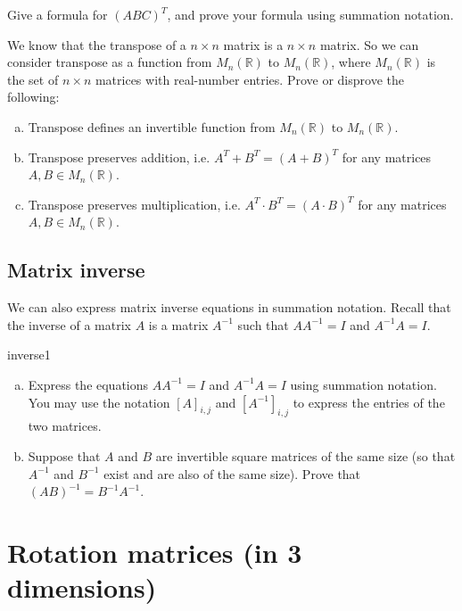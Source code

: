 \begin{exercise}{}
Give a formula for $(ABC)^T$, and prove your formula using summation notation.
\end{exercise}

\begin{exercise}{}
We know that the transpose of a $n \times n$ matrix is a $n \times n$ matrix.  So we can consider transpose as a function from $M_n(\mathbb{R})$ to $M_n(\mathbb{R})$, where   $M_n(\mathbb{R})$  is the set of $n \times n$ matrices with real-number entries. Prove or disprove the following:
\begin{enumerate}[(a)]
\item
Transpose defines an invertible function from $M_n(\mathbb{R})$ to $M_n(\mathbb{R})$.
\item
Transpose preserves addition, i.e. $A^T + B^T = (A+B)^T$ for any matrices $A,B \in M_n(\mathbb{R})$.
\item
Transpose preserves multiplication, i.e. $A^T \cdot B^T = (A\cdot B)^T$ for any matrices $A,B \in M_n(\mathbb{R})$.

\end{enumerate}
\end{exercise}



\subsection{Matrix inverse}
\label{subsec:SigmaApp:MatrixTransposeInverses:MatrixInverse}

We can also express matrix inverse equations in summation notation.  Recall that the inverse of a matrix $A$ is a matrix $A^{-1}$ such that $AA^{-1}=I$ and $A^{-1}A=I$.

\begin{exercise}{inverse1}
\begin{enumerate}[(a)]
\item
Express the equations $AA^{-1}=I$ and $A^{-1}A=I$ using summation notation.  You may use the notation $[A]_{i,j}$ and $[A^{-1}]_{i,j}$ to express the entries of the two matrices.
\item
Suppose that $A$ and $B$ are invertible square matrices of the same size (so that $A^{-1}$ and $B^{-1}$ exist and are also of the same size). Prove that $(AB)^{-1} = B^{-1}A^{-1}$.
\end{enumerate}
\end{exercise}

\section{Rotation matrices (in 3 dimensions)}
\label{sec:SigmaApp:RotationMatrix3D}


